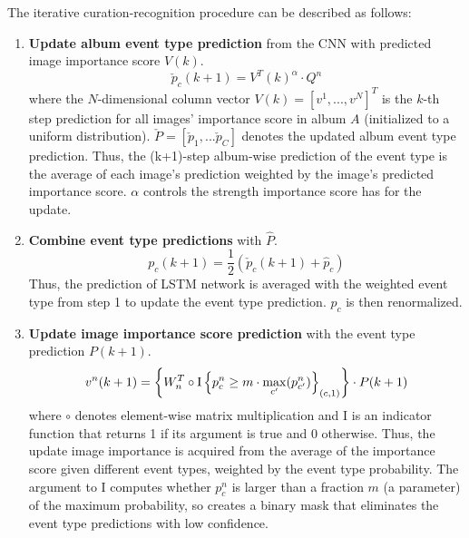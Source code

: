 \documentclass[runningheads]{llncs}
\begin{document}
The iterative curation-recognition procedure can be described as follows:
\begin{enumerate}
  \item \textbf{Update album event type prediction} from the CNN with predicted image importance score $V(k)$.
  \begin{equation}
  \check{p}_{c}(k+1) = V^{T}(k)^{\alpha }\cdot  Q^{n}
  \label{eq1}
  \end{equation}
  where the $N$-dimensional column vector $V(k) = [v^{1}, ..., v^{N}]^{T}$ is the $k$-th step prediction for all images' importance score in album $A$ (initialized to a uniform distribution). $\check{P} = [\check{p}_{1}, ... \check{p}_{C}]$ denotes the updated  album event type prediction. Thus, the (k+1)-step album-wise prediction of the event type is the average of each image's prediction weighted by the image's predicted importance score. $\alpha$ controls the strength importance score has for the update.
%
%
%
%
%
%
\vspace{0.05in}
    \item \textbf{Combine event type predictions} with $\hat{P}$.
  \begin{equation}
  p_{c}(k+1) = \frac{1}{2}(\check{p}_{c}(k+1) + \hat{p}_{c})
  \label{eq2}
  \end{equation}
Thus, the prediction of LSTM network is averaged with the weighted event type from step 1 to update the event type prediction. $p_{c}$ is then renormalized. 
%
\vspace{0.05in}
  \item \textbf{Update image importance score prediction} with the event type prediction $P(k+1)$.
  \begin{equation}
v^{n}(k+1) = \left \{W_{n}^{T} \circ \textup{I}\left \{ p^{n}_{c}\geq m\cdot \max_{c'}(p^{n}_{c'}) \right \}_{(c,1)}\right \} \cdot  P(k+1)
  \label{eq3}
\end{equation}
 where $\circ$ denotes element-wise matrix multiplication and \textup{I} is an indicator function that returns 1 if its argument is true and 0 otherwise. Thus, the update image importance is acquired from the average of the importance score given different event types, weighted by the event type probability. The argument to \textup{I} computes whether $p^{n}_{c}$ is larger than a fraction $m$ (a parameter) of the maximum probability, so creates a binary mask that eliminates the event type predictions with low confidence. 

\end{enumerate}
\end{document}

